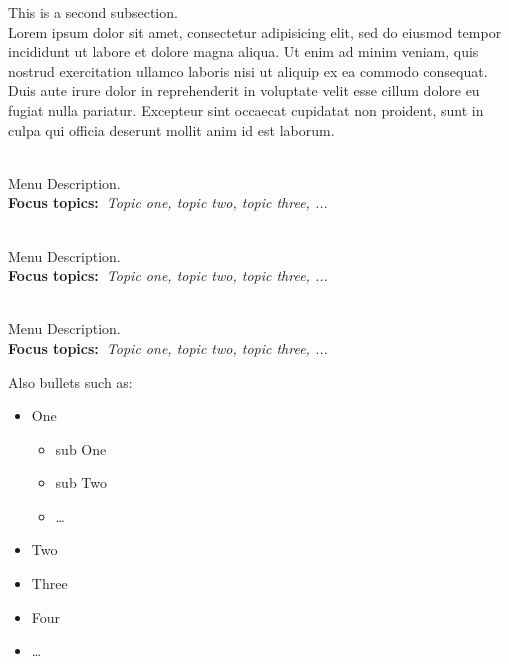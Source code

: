   This is a second subsection\cite{bazerman1988shaping}. ~\\
  Lorem ipsum dolor sit amet, consectetur adipisicing elit, sed do eiusmod
  tempor incididunt ut labore et dolore magna aliqua. Ut enim ad minim veniam,
  quis nostrud exercitation ullamco laboris nisi ut aliquip ex ea commodo
  consequat. Duis aute irure dolor in reprehenderit in voluptate velit esse
  cillum dolore eu fugiat nulla pariatur. Excepteur sint occaecat cupidatat non
  proident, sunt in culpa qui officia deserunt mollit anim id est laborum.

  \begin{description}\addtolength{\itemsep}{-0.35\baselineskip}%
  
    \item[\textbullet~\bfseries Menu Item] \hfill \\%
      Menu Description.~\\%
      {\textbf{Focus topics:~}\emph{Topic one, topic two, topic three, ...}}%
    
    \item[\textbullet~\bfseries Menu Item] \hfill \\%
      Menu Description.~\\%
      {\textbf{Focus topics:~}\emph{Topic one, topic two, topic three, ...}}%
    
    
    \item[\textbullet~\bfseries Menu Item] \hfill \\%
      Menu Description.~\\%
      {\textbf{Focus topics:~}\emph{Topic one, topic two, topic three, ...}}%
  
  \end{description}
  Also bullets such as:%
  \begin{itemize}\addtolength{\itemsep}{-0.35\baselineskip}%
    \item One%
        \begin{itemize}\addtolength{\itemsep}{-0.35\baselineskip}%
        \item sub One%
        \item sub Two%
        \item \ldots%
        \end{itemize}%
    \item Two%
    \item Three%
    \item Four%
    \item \ldots%
  \end{itemize}%
  
